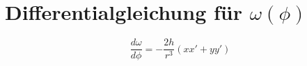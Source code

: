 \section{Differentialgleichung für \(\omega(\phi)\)}
\[ \frac{d\omega}{d\phi} = -\frac{2h}{r^3}(xx' + yy') \]